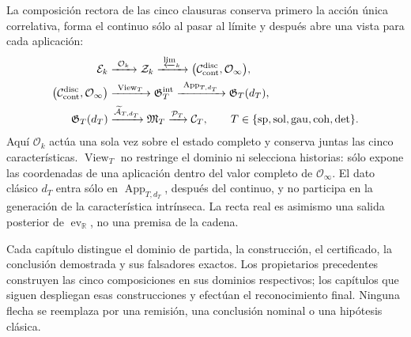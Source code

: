La composición rectora de las cinco clausuras conserva primero la acción única
correlativa, forma el continuo sólo al pasar al límite y después abre una vista para
cada aplicación:
\[
\begin{aligned}
 \mathcal E_k&\xrightarrow{\ \mathcal O_k\ }\mathcal Z_k
 \xrightarrow{\ \varprojlim_k\ }
 \bigl(\mathcal C_{\rm cont}^{\rm disc},\mathcal O_\infty\bigr),\\
 \bigl(\mathcal C_{\rm cont}^{\rm disc},\mathcal O_\infty\bigr)
 &\xrightarrow{\ \operatorname{View}_T\ }\mathfrak G_T^{\rm int}
 \xrightarrow{\ \operatorname{App}_{T,d_T}\ }\mathfrak G_T(d_T),\\
 \mathfrak G_T(d_T)&
 \xrightarrow{\widetilde{\mathcal A}_{T,d_T}}\mathfrak M_T
 \xrightarrow{\mathcal P_T}\mathcal C_T,
 \qquad T\in\{\mathrm{sp,sol,gau,coh,det}\}.
\end{aligned}
\]
Aquí $\mathcal O_k$ actúa una sola vez sobre el estado completo y conserva juntas
las cinco características. $\operatorname{View}_T$ no restringe el dominio ni
selecciona historias: sólo expone las coordenadas de una aplicación dentro del valor
completo de $\mathcal O_\infty$. El dato clásico $d_T$ entra sólo en
$\operatorname{App}_{T,d_T}$, después del continuo, y no participa en la generación
de la característica intrínseca. La recta real es asimismo una salida posterior de
$\operatorname{ev}_{\mathbb R}$, no una premisa de la cadena.

Cada capítulo distingue el dominio de partida, la construcción, el certificado,
la conclusión demostrada y sus falsadores exactos. Los propietarios precedentes
construyen las cinco composiciones en sus dominios respectivos; los capítulos que
siguen despliegan esas construcciones y efectúan el reconocimiento final. Ninguna
flecha se reemplaza por una remisión, una conclusión nominal o una hipótesis clásica.
